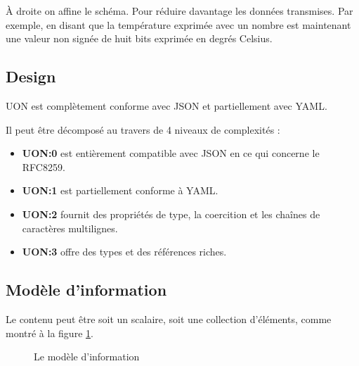 \documentclass[
    iict, %
    il, %
]{heig-tb}
\begin{document}
À droite on affine le schéma. Pour réduire davantage les données transmises.
Par exemple, en disant que la température exprimée avec un nombre est maintenant une valeur non signée de huit bits exprimée en degrés Celsius.

\subsection{Design}
UON est complètement conforme avec JSON et partiellement avec YAML.

Il peut être décomposé au travers de 4 niveaux de complexités :
\begin{itemize}
    \item \textbf{UON:0} est entièrement compatible avec JSON en ce qui concerne le RFC8259.
    \item \textbf{UON:1} est partiellement conforme à YAML.
    \item \textbf{UON:2} fournit des propriétés de type, la coercition et les chaînes de caractères multilignes.
    \item \textbf{UON:3} offre des types et des références riches.
\end{itemize}

\subsection{Modèle d'information}

Le contenu peut être soit un scalaire, soit une collection d'éléments, comme montré à la figure \ref{information-model}.

\begin{figure}[H]
    \begin{center}
    \end{center}
    \caption[Le modèle d'information]{\label{information-model}Le modèle d'information}
\end{figure}
\end{document}

